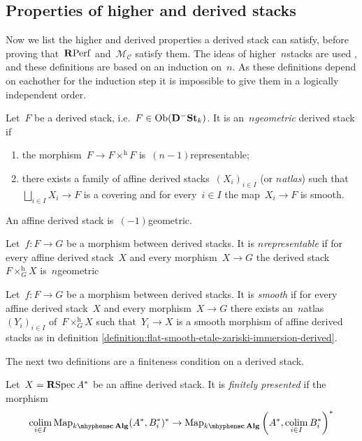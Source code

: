 \begin{refsection}
\subsection{Properties of higher and derived stacks}
Now we list the higher and derived properties a derived stack can satisfy, before proving that~$\mathbf{R}\mathrm{Perf}$ and~$\mathcal{M}_{\mathcal{C}}$ satisfy them. The ideas of higher~$n$\dash stacks are used \cite{hirschowitz-simpson-descente-pour-les-n-champs}, and these definitions are based on an induction on~$n$. As these definitions depend on eachother for the induction step it is impossible to give them in a logically independent order.
\begin{definition}
  Let~$F$ be a derived stack, i.e.\ $F\in\operatorname{Ob}(\mathbf{D}^-\mathbf{St}_k)$. It is an~\emph{$n$\dash geometric} derived stack if
  \begin{enumerate}
    \item the morphism~$F\to F\times^{\mathrm{h}}F$ is~$(n-1)$\dash representable;
    \item there exists a family of affine derived stacks~$(X_i)_{i\in I}$ (or \emph{$n$\dash atlas}) such that~$\bigsqcup_{i\in I}X_i\to F$ is a covering and for every~$i\in I$ the map~$X_i\to F$ is smooth.
  \end{enumerate}
  An affine derived stack is~$(-1)$\dash geometric.
\end{definition}
\begin{definition}
  Let~$f\colon F\to G$ be a morphism between derived stacks. It is \emph{$n$\dash representable} if for every affine derived stack~$X$ and every morphism~$X\to G$ the derived stack~$F\times_G^{\mathrm{h}}X$ is~$n$\dash geometric
\end{definition}
\begin{definition}
  Let~$f\colon F\to G$ be a morphism between derived stacks. It is \emph{smooth} if for every affine derived stack~$X$ and every morphism~$X\to G$ there exists an~$n$\dash atlas~$(Y_i)_{i\in I}$ of~$F\times_G^{\mathrm{h}}X$ such that~$Y_i\to X$ is a smooth morphism of affine derived stacks as in definition \ref{definition:flat-smooth-etale-zariski-immersion-derived}.
\end{definition}
The next two definitions are a finiteness condition on a derived stack.
\begin{definition}
  Let~$X=\operatorname{\mathbf{R}Spec} A^*$ be an affine derived stack. It is \emph{finitely presented} if the morphism
  \begin{equation}
    \colim_{i\in I}\Map_{\scAlg{k}}(A^*,B_i^*)^*\to\Map_{\scAlg{k}}\left( A^*,\colim_{i\in I}B_i^* \right)^*

\end{equation}
\end{definition}
\end{refsection}
